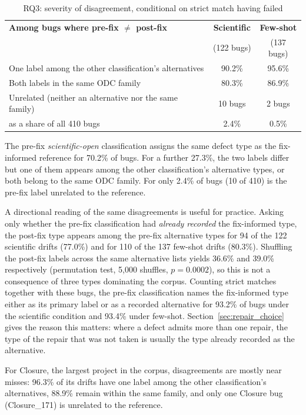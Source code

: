 \documentclass{iutbscthesis}
\begin{document}
\begin{table}[!htbp]
    \centering
    \begin{tabular}{p{7.0cm} c c}
        \toprule
        \textbf{Among bugs where pre-fix $\neq$ post-fix} & \textbf{Scientific} & \textbf{Few-shot} \\
        & (122 bugs) & (137 bugs) \\
        \midrule
        One label among the other classification's alternatives & 90.2\% & 95.6\% \\
        Both labels in the same ODC family & 80.3\% & 86.9\% \\
        Unrelated (neither an alternative nor the same family) & 10 bugs & 2 bugs \\
        \quad as a share of all 410 bugs & 2.4\% & 0.5\% \\
        \bottomrule
    \end{tabular}
    \caption{RQ3: severity of disagreement, conditional on strict match having failed}
    \label{tab:rq3_cond}
\end{table}

The pre-fix \textit{scientific-open} classification assigns the same defect type as the fix-informed reference for 70.2\% of bugs. For a further 27.3\%, the two labels differ but one of them appears among the other classification's alternative types, or both belong to the same ODC family. For only 2.4\% of bugs (10 of 410) is the pre-fix label unrelated to the reference.

A directional reading of the same disagreements is useful for practice. Asking only whether the pre-fix classification had \emph{already recorded} the fix-informed type, the post-fix type appears among the pre-fix alternative types for 94 of the 122 scientific drifts (77.0\%) and for 110 of the 137 few-shot drifts (80.3\%). Shuffling the post-fix labels across the same alternative lists yields 36.6\% and 39.0\% respectively (permutation test, 5,000 shuffles, $p = 0.0002$), so this is not a consequence of three types dominating the corpus. Counting strict matches together with these bugs, the pre-fix classification names the fix-informed type either as its primary label or as a recorded alternative for 93.2\% of bugs under the scientific condition and 93.4\% under few-shot. Section~\ref{sec:repair_choice} gives the reason this matters: where a defect admits more than one repair, the type of the repair that was not taken is usually the type already recorded as the alternative.

For Closure, the largest project in the corpus, disagreements are mostly near misses: 96.3\% of its drifts have one label among the other classification's alternatives, 88.9\% remain within the same family, and only one Closure bug (Closure\_171) is unrelated to the reference.
\end{document}
